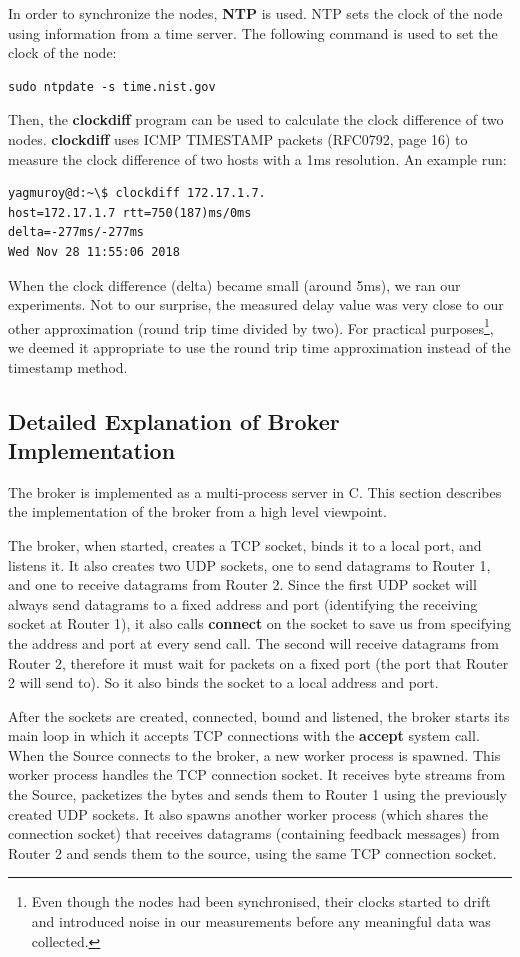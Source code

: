 \documentclass[conference]{IEEEtran}
\begin{document}
In order to synchronize the nodes, \textbf{NTP} is used. NTP sets the clock of the
node using information from a time server. The following command is used to set the
clock of the node:
\begin{lstlisting}
sudo ntpdate -s time.nist.gov
\end{lstlisting}
Then, the \textbf{clockdiff} program can be used to calculate the clock difference
of two nodes. \textbf{clockdiff} uses ICMP TIMESTAMP packets (RFC0792, page 16)
to measure the clock difference of two hosts with a 1ms resolution. An example run:
\begin{lstlisting}
yagmuroy@d:~\$ clockdiff 172.17.1.7.
host=172.17.1.7 rtt=750(187)ms/0ms
delta=-277ms/-277ms
Wed Nov 28 11:55:06 2018
\end{lstlisting}
When the clock difference (delta) became small (around 5ms), we ran our experiments.
Not to our surprise, the measured delay value was very close to our other approximation
(round trip time divided by two). For practical purposes\footnote{Even though the nodes had been
synchronised, their clocks started to drift and introduced noise in our measurements
before any meaningful data was collected.}, we deemed it appropriate
to use the round trip time approximation instead of the timestamp method.

\subsection{Detailed Explanation of Broker Implementation}
The broker is implemented as a multi-process server in C. This section describes
the implementation of the broker from a high level viewpoint.

The broker, when started, creates a TCP socket, binds it to a local port, and listens
it. It also creates two UDP sockets, one to send datagrams to Router 1, and one to receive
datagrams from Router 2. Since the first UDP socket will always send datagrams to a
fixed address and port (identifying the receiving socket at Router 1), it also
calls \textbf{connect} on the socket to save us from specifying the address and port at every send call.
The second will receive datagrams from Router 2, therefore it must wait for packets
on a fixed port (the port that Router 2 will send to). So it also binds the socket
to a local address and port.

After the sockets are created, connected, bound and listened, the broker starts
its main loop in which it accepts TCP connections with the \textbf{accept} system call.
When the Source connects to the broker, a new worker process is spawned. This worker
process handles the TCP connection socket. It receives byte streams from the Source,
packetizes the bytes and sends them to Router 1 using the previously
created UDP sockets. It also spawns another worker process (which shares the connection
socket) that receives datagrams (containing feedback messages) from Router 2 and
sends them to the source, using the same TCP connection socket.
\end{document}
